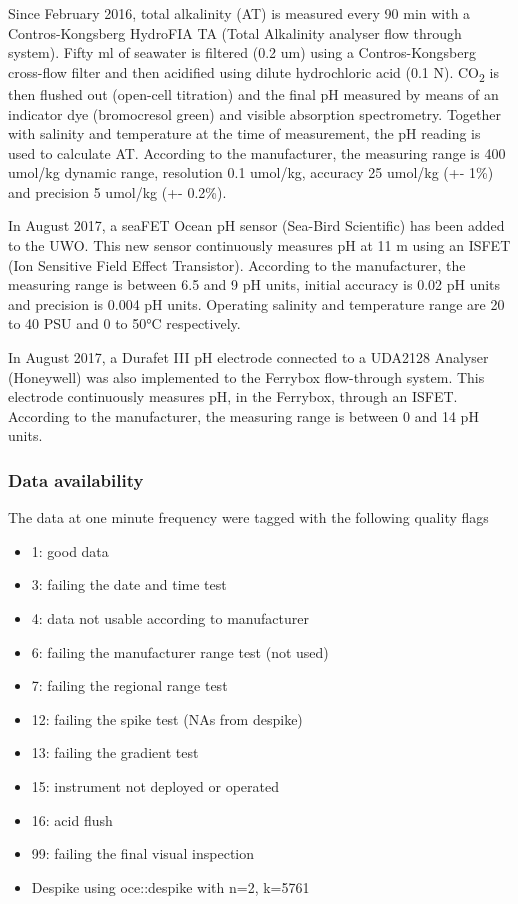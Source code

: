 \documentclass[
]{article}
\begin{document}
Since February 2016, total alkalinity (AT) is measured every 90 min with
a Contros-Kongsberg HydroFIA TA (Total Alkalinity analyser flow through
system). Fifty ml of seawater is filtered (0.2 um) using a
Contros-Kongsberg cross-flow filter and then acidified using dilute
hydrochloric acid (0.1 N). CO\textsubscript{2} is then flushed out
(open-cell titration) and the final pH measured by means of an indicator
dye (bromocresol green) and visible absorption spectrometry. Together
with salinity and temperature at the time of measurement, the pH reading
is used to calculate AT. According to the manufacturer, the measuring
range is 400 umol/kg dynamic range, resolution 0.1 umol/kg, accuracy 25
umol/kg (+- 1\%) and precision 5 umol/kg (+- 0.2\%).

In August 2017, a seaFET Ocean pH sensor (Sea-Bird Scientific) has been
added to the UWO. This new sensor continuously measures pH at 11 m using
an ISFET (Ion Sensitive Field Effect Transistor). According to the
manufacturer, the measuring range is between 6.5 and 9 pH units, initial
accuracy is 0.02 pH units and precision is 0.004 pH units. Operating
salinity and temperature range are 20 to 40 PSU and 0 to 50°C
respectively.

In August 2017, a Durafet III pH electrode connected to a UDA2128
Analyser (Honeywell) was also implemented to the Ferrybox flow-through
system. This electrode continuously measures pH, in the Ferrybox,
through an ISFET. According to the manufacturer, the measuring range is
between 0 and 14 pH units.

\hypertarget{data-availability}{%
\subsubsection{\texorpdfstring{\textbf{Data
availability}}{Data availability}}\label{data-availability}}

The data at one minute frequency were tagged with the following quality
flags

\begin{itemize}
\item
  1: good data
\item
  3: failing the date and time test
\item
  4: data not usable according to manufacturer
\item
  6: failing the manufacturer range test (not used)
\item
  7: failing the regional range test
\item
  12: failing the spike test (NAs from despike)
\item
  13: failing the gradient test
\item
  15: instrument not deployed or operated
\item
  16: acid flush
\item
  99: failing the final visual inspection
\item
  Despike using oce::despike with n=2, k=5761
\end{itemize}
\end{document}

